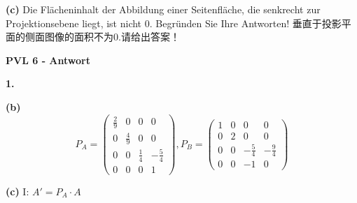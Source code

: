 \documentclass[fleqn]{article}
\begin{document}
\indent\textbf{(c)} Die Flächeninhalt der Abbildung einer Seitenfläche, die senkrecht zur Projektionsebene liegt, ist nicht 0. Begründen Sie Ihre Antworten!
垂直于投影平面的侧面图像的面积不为0.请给出答案！

\noindent\textbf{PVL 6 - Antwort}

\indent\textbf{1.}

\indent\indent\textbf{(b)}
$$
P_A = 
\begin{pmatrix}
    \frac{2}{9} & 0 & 0 & 0 \\
    0 & \frac{4}{9} & 0 & 0 \\
    0 & 0 & \frac{1}{4} & -\frac{5}{4} \\
    0 & 0 & 0 & 1
\end{pmatrix}, 
P_B =
\begin{pmatrix}
    1 & 0 & 0 & 0 \\
    0 & 2 & 0 & 0 \\
    0 & 0 & -\frac{5}{4} & -\frac{9}{4} \\ 
    0 & 0 & -1 & 0
\end{pmatrix}
$$

\indent\indent\textbf{(c)}
I: $A' = P_A \cdot A $
\end{document}
